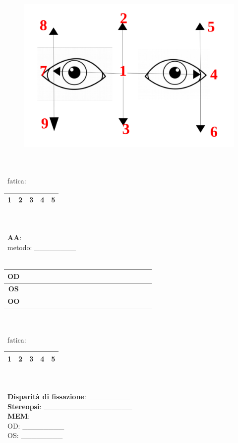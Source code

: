  \begin{figure}[h!]
	\centering
	\includegraphics[scale=0.27]{source/immagini/posizioni_cover_test.png}
	\label{fig:issuexample}
\end{figure}
\\\ \\\
fatica:
\begin{table}[H]
\begin{tabular}{|c|c|c|c|c|} \hline
{\textbf{1}} & {\textbf{2}} & {\textbf{3}} & {\textbf{4}} & {\textbf{5}}\\ \hline
\end{tabular}
\end{table}
\\\ \\\
\textbf{AA}:
\\\
metodo: \_\_\_\_\_\_\_\_
\\\
\begin{table}[H]
\begin{tabular}{|c|c|c|c|} \hline
{\textbf{OD}} & {\ \ \ \ \ \ \ \ \ }  & {\ \ \ \ \ \ \ \ \ } & {\ \ \ \ \ \ \ \ \ } \\ \hline
\textbf{OS} & &  &  \\ \hline
\textbf{OO} &  &  &  \\ \hline
\end{tabular}
\end{table}
\\\ \\\
fatica:
\begin{table}[H]
\begin{tabular}{|c|c|c|c|c|} \hline
{\textbf{1}} & {\textbf{2}} & {\textbf{3}} & {\textbf{4}} & {\textbf{5}}\\ \hline
\end{tabular}
\end{table}
\\\ \\\
\textbf{Disparità di fissazione}: \_\_\_\_\_\_\_\_
\\\
\textbf{Stereopsi}: \_\_\_\_\_\_\_\_\_\_\_\_\_\_\_\_\_
\\\
\textbf{MEM}: 
\\\
OD: \_\_\_\_\_\_\_\_
\\\
OS: \_\_\_\_\_\_\_\_
